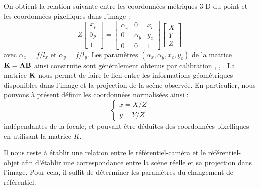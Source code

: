 On obtient la relation suivante entre les coordonnées métriques 3-D du point et 
les coordonnées pixelliques dans l'image :
\begin{equation}
Z\begin{bmatrix}
x_p \\y_p \\ 1
\end{bmatrix}
=
\begin{bmatrix}
\alpha_x & 0 & x_c \\ 0 & \alpha_y & y_c \\ 0 & 0 & 1 
\end{bmatrix}
\begin{bmatrix}
X \\ Y \\ Z
\end{bmatrix}
\label{intro:eq16}
\end{equation}
avec $\alpha_x = f/l_x$ et $\alpha_y = f/l_y$. Les paramètres $(\alpha_x, 
\alpha_y, x_c, y_c)$ de la matrice ${\bf K} = {\bf A}{\bf B}$ ainsi construite 
sont généralement obtenus par calibration \cite{brown71}, \cite{tsai1986}, 
\cite{stein1997}. La matrice ${\bf K}$ nous permet de faire le lien entre les 
informations géométriques disponibles dans l'image et la projection de la scène 
observée. En particulier, nous pouvons à présent définir les 
coordonnées normalisées ainsi :
\begin{equation}
\left \lbrace
\begin{matrix}
x = X/Z \\
y = Y/Z
\end{matrix} \right .
\label{intro:eq17}
\end{equation}
indépendantes de la focale, et pouvant être déduites des coordonnées 
pixelliques 
en utilisant la matrice $K$.

Il nous reste à établir une relation entre le référentiel-caméra et le 
référentiel-objet afin d'établir une correspondance entre la scène réelle et sa 
projection dans l'image. Pour cela, il suffit de déterminer les paramètres du 
changement de référentiel.

